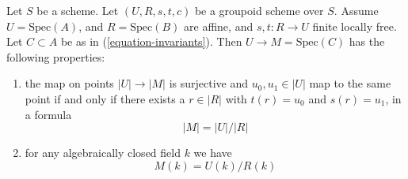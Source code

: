 \begin{lemma}
\label{lemma-points}
Let $S$ be a scheme. Let $(U, R, s, t, c)$ be a groupoid scheme over $S$.
Assume $U = \text{Spec}(A)$, and $R = \text{Spec}(B)$ are affine, and
$s, t : R \to U$ finite locally free. Let $C \subset A$ be as in
(\ref{equation-invariants}). Then $U \to M = \text{Spec}(C)$ has
the following properties:
\begin{enumerate}
\item the map on points $|U| \to |M|$ is surjective and
$u_0, u_1 \in |U|$ map to the same point if and only if 
there exists a $r \in |R|$ with $t(r) = u_0$ and $s(r) = u_1$, in 
a formula
$$
|M| = |U|/|R|
$$
\item for any algebraically closed field $k$ we have
$$
M(k) = U(k)/R(k)
$$
\end{enumerate}
\end{lemma}

